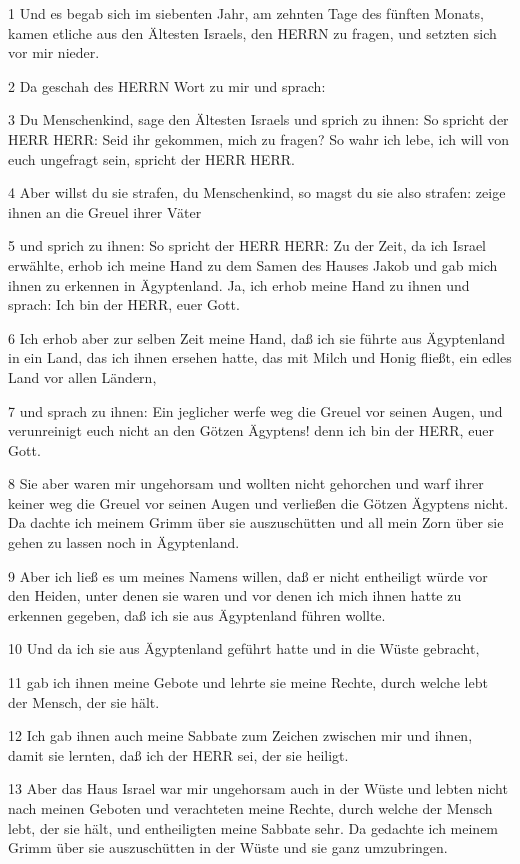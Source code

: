 \par 1 Und es begab sich im siebenten Jahr, am zehnten Tage des fünften Monats, kamen etliche aus den Ältesten Israels, den HERRN zu fragen, und setzten sich vor mir nieder.
\par 2 Da geschah des HERRN Wort zu mir und sprach:
\par 3 Du Menschenkind, sage den Ältesten Israels und sprich zu ihnen: So spricht der HERR HERR: Seid ihr gekommen, mich zu fragen? So wahr ich lebe, ich will von euch ungefragt sein, spricht der HERR HERR.
\par 4 Aber willst du sie strafen, du Menschenkind, so magst du sie also strafen: zeige ihnen an die Greuel ihrer Väter
\par 5 und sprich zu ihnen: So spricht der HERR HERR: Zu der Zeit, da ich Israel erwählte, erhob ich meine Hand zu dem Samen des Hauses Jakob und gab mich ihnen zu erkennen in Ägyptenland. Ja, ich erhob meine Hand zu ihnen und sprach: Ich bin der HERR, euer Gott.
\par 6 Ich erhob aber zur selben Zeit meine Hand, daß ich sie führte aus Ägyptenland in ein Land, das ich ihnen ersehen hatte, das mit Milch und Honig fließt, ein edles Land vor allen Ländern,
\par 7 und sprach zu ihnen: Ein jeglicher werfe weg die Greuel vor seinen Augen, und verunreinigt euch nicht an den Götzen Ägyptens! denn ich bin der HERR, euer Gott.
\par 8 Sie aber waren mir ungehorsam und wollten nicht gehorchen und warf ihrer keiner weg die Greuel vor seinen Augen und verließen die Götzen Ägyptens nicht. Da dachte ich meinem Grimm über sie auszuschütten und all mein Zorn über sie gehen zu lassen noch in Ägyptenland.
\par 9 Aber ich ließ es um meines Namens willen, daß er nicht entheiligt würde vor den Heiden, unter denen sie waren und vor denen ich mich ihnen hatte zu erkennen gegeben, daß ich sie aus Ägyptenland führen wollte.
\par 10 Und da ich sie aus Ägyptenland geführt hatte und in die Wüste gebracht,
\par 11 gab ich ihnen meine Gebote und lehrte sie meine Rechte, durch welche lebt der Mensch, der sie hält.
\par 12 Ich gab ihnen auch meine Sabbate zum Zeichen zwischen mir und ihnen, damit sie lernten, daß ich der HERR sei, der sie heiligt.
\par 13 Aber das Haus Israel war mir ungehorsam auch in der Wüste und lebten nicht nach meinen Geboten und verachteten meine Rechte, durch welche der Mensch lebt, der sie hält, und entheiligten meine Sabbate sehr. Da gedachte ich meinem Grimm über sie auszuschütten in der Wüste und sie ganz umzubringen.
